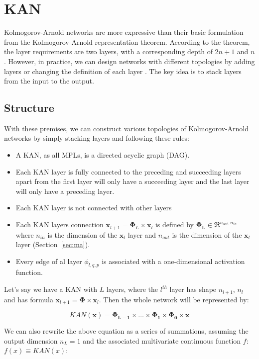 \documentclass[12pt,a4paper]{article}
\begin{document}
\section{KAN}
Kolmogorov-Arnold networks are more expressive than their basic formulation from the Kolmogorov-Arnold representation theorem. 
According to the theorem, the layer requirements are two layers, with a corresponding depth of \(2n+1\) and \(n\). However, in practice, we can design networks with different topologies by adding layers or changing the definition of each layer \cite{KAN}. The key idea is to stack layers from the input to the output.

\subsection{Structure}
With these premises, we can construct various topologies of Kolmogorov-Arnold networks by simply stacking layers and following these rules:
\begin{itemize}
    \item A KAN, as all MPLs, is a directed acyclic graph (DAG). 
    \item Each KAN layer is fully connected to the preceding and succeeding layers apart from the first layer will only have a succeeding layer and the last layer will only have a preceding layer.
    \item Each KAN layer is not connected with other layers
    \item Each KAN layers connection $\textbf{x}_{l+1} = \boldsymbol{\Phi}_L \times \textbf{x}_l$ is defined by $\boldsymbol{\Phi_{L}} \in \Re^{n_{out},n_{in}}$ where $n_{in}$ is the dimension of the $\textbf{x}_l$ layer and $n_{out}$ is the dimension of the $\textbf{x}_l$ layer (Section~\ref{sec:ma}).
    \item Every edge of al layer $\phi_{l,q,p}$ is associated with a one-dimensional activation function. 
\end{itemize}

Let’s say we have a KAN with $L$ layers, where the $l^{th}$ layer has shape $n_{l+1}$, $n_l$ and has formula $\textbf{x}_{l+1} = \boldsymbol{\Phi} \times \textbf{x}_l $. Then the whole network will be represented by:

$$KAN(\textbf{x}) = \boldsymbol{\Phi_{L-1}} \times \dots \times \boldsymbol{\Phi_{1}} \times \boldsymbol{\Phi_{0}} \times \textbf{x}$$

We can also rewrite the above equation as a series of summations, assuming the output dimension $n_L = 1$ and the associated multivariate
continuous function $f$:  $f(x) \equiv KAN(x)$:
\end{document}
